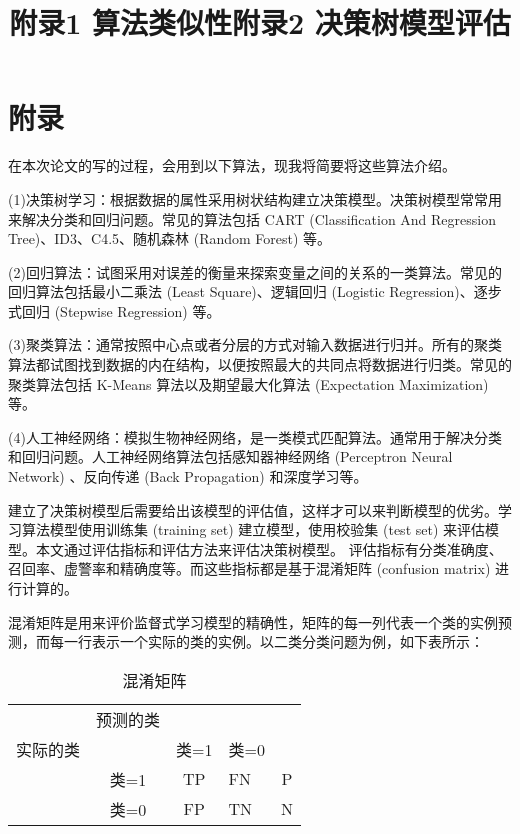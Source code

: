 \section*{附录}
在本次论文的写的过程，会用到以下算法，现我将简要将这些算法介绍。

\title{附录1  算法类似性}

(1)决策树学习：根据数据的属性采用树状结构建立决策模型。决策树模型常常用来解决分类和回归问题。常见的算法包括 CART (Classification And Regression Tree)、ID3、C4.5、随机森林 (Random Forest) 等。

(2)回归算法：试图采用对误差的衡量来探索变量之间的关系的一类算法。常见的回归算法包括最小二乘法 (Least Square)、逻辑回归 (Logistic Regression)、逐步式回归 (Stepwise Regression) 等。

(3)聚类算法：通常按照中心点或者分层的方式对输入数据进行归并。所有的聚类算法都试图找到数据的内在结构，以便按照最大的共同点将数据进行归类。常见的聚类算法包括 K-Means 算法以及期望最大化算法 (Expectation Maximization) 等。

(4)人工神经网络：模拟生物神经网络，是一类模式匹配算法。通常用于解决分类和回归问题。人工神经网络算法包括感知器神经网络 (Perceptron Neural Network) 、反向传递 (Back Propagation) 和深度学习等。

\newpage
\title{附录2   决策树模型评估}

建立了决策树模型后需要给出该模型的评估值，这样才可以来判断模型的优劣。学习算法模型使用训练集 (training set) 建立模型，使用校验集 (test set) 来评估模型。本文通过评估指标和评估方法来评估决策树模型。 评估指标有分类准确度、召回率、虚警率和精确度等。而这些指标都是基于混淆矩阵 (confusion matrix) 进行计算的。

混淆矩阵是用来评价监督式学习模型的精确性，矩阵的每一列代表一个类的实例预测，而每一行表示一个实际的类的实例。以二类分类问题为例，如下表所示：

\begin{table}[thbp]\footnotesize
	\caption{混淆矩阵}
	\begin{center}
		\begin{tabular}{cc|clc}
			\hline	&预测的类\\
			  实际的类& & 类=1 & 类=0  \\ 
			\hline &类=1 & TP & FN &P\\ 	
			\hline &类=0 & FP & TN&N \\ 
			\hline
		\end{tabular} 
	\end{center}
\end{table}


